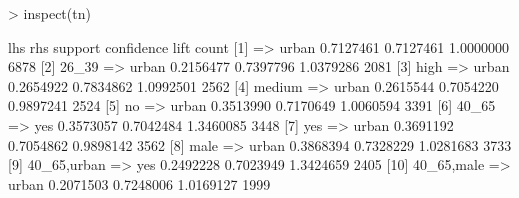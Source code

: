 \documentclass [a4paper] {article}
\begin{document}
\begin{Schunk}
\begin{Sinput}
> inspect(tn)
\end{Sinput}
\begin{Soutput}
     lhs              rhs     support   confidence lift      count
[1]  {}            => {urban} 0.7127461 0.7127461  1.0000000 6878 
[2]  {26_39}       => {urban} 0.2156477 0.7397796  1.0379286 2081 
[3]  {high}        => {urban} 0.2654922 0.7834862  1.0992501 2562 
[4]  {medium}      => {urban} 0.2615544 0.7054220  0.9897241 2524 
[5]  {no}          => {urban} 0.3513990 0.7170649  1.0060594 3391 
[6]  {40_65}       => {yes}   0.3573057 0.7042484  1.3460085 3448 
[7]  {yes}         => {urban} 0.3691192 0.7054862  0.9898142 3562 
[8]  {male}        => {urban} 0.3868394 0.7328229  1.0281683 3733 
[9]  {40_65,urban} => {yes}   0.2492228 0.7023949  1.3424659 2405 
[10] {40_65,male}  => {urban} 0.2071503 0.7248006  1.0169127 1999 
\end{Soutput}
\end{Schunk}
\end{document}
